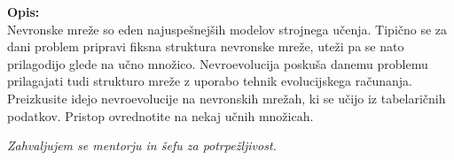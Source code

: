 \documentclass[a4paper,12pt,openright]{book}
\newcommand{\clearemptydoublepage}{\newpage{\pagestyle{empty}\cleardoublepage}}
\begin{document}
    \bigskip
    \noindent\textbf{Opis:}\\
    Nevronske mreže so eden najuspešnejših modelov strojnega učenja.
    Tipično se za dani problem pripravi fiksna struktura nevronske mreže, uteži pa se nato prilagodijo glede na učno množico.
    Nevroevolucija poskuša danemu problemu prilagajati tudi strukturo mreže z uporabo tehnik evolucijskega računanja.
    Preizkusite idejo nevroevolucije na nevronskih mrežah, ki se učijo iz tabelaričnih podatkov.
    Pristop ovrednotite na nekaj učnih množicah.



    \vfill



    \vspace{2cm}

    \clearemptydoublepage

    \thispagestyle{empty}\mbox{}\vfill\null\it%
    \noindent
    Zahvaljujem se mentorju in šefu za potrpežljivost.
    \rm\normalfont

    \clearemptydoublepage


    \clearemptydoublepage


    \pagestyle{empty}
    \def\thepage{}%
    \tableofcontents{}
\end{document}
